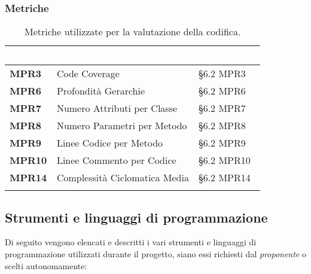 \subsubsection{Metriche}
\setlength{\freewidth}{\dimexpr\textwidth-0\tabcolsep}
\renewcommand{\arraystretch}{1.5}
\setlength{\aboverulesep}{0pt}
\setlength{\belowrulesep}{0pt}
\begin{longtable}{L{.22\freewidth} L{.4\freewidth} L{.2\freewidth}}
	\toprule
	\textcolor{white}{\textbf{Metrica}}&
	\textcolor{white}{\textbf{Descrizione}}&	
	\textcolor{white}{\textbf{Riferimento}}\\
	\toprule
	\endhead

	\textbf{MPR3} & Code Coverage & \S 6.2 MPR3 \\
	\textbf{MPR6} & Profondità Gerarchie &  \S6.2 MPR6 \\
	\textbf{MPR7} & Numero Attributi per Classe & \S 6.2 MPR7 \\
	\textbf{MPR8} & Numero Parametri per Metodo & \S 6.2 MPR8 \\
	\textbf{MPR9} & Linee Codice per Metodo & \S 6.2 MPR9 \\
	\textbf{MPR10} & Linee Commento per Codice & \S 6.2 MPR10 \\
	\textbf{MPR14} & Complessità Ciclomatica Media & \S 6.2 MPR14 \\

	\bottomrule
	\caption*{Metriche utilizzate per la valutazione della codifica.}
\end{longtable}

\subsection{Strumenti e linguaggi di programmazione}
Di seguito vengono elencati e descritti i vari strumenti e linguaggi di programmazione utilizzati durante il progetto, siano essi richiesti dal \emph{proponente} o scelti autonomamente:
